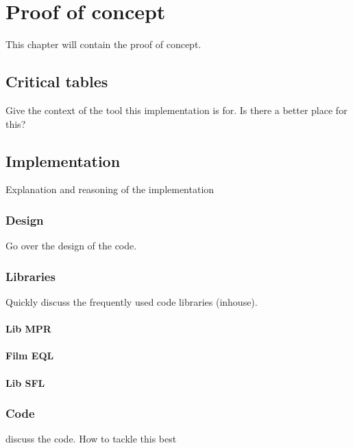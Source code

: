 
\chapter{Proof of concept}
\label{ch:poc}

This chapter will contain the proof of concept.

\section{Critical tables}
Give the context of the tool this implementation is for. Is there a better place for this?

\section{Implementation}
Explanation and reasoning of the implementation

\subsection{Design}
Go over the design of the code.
\subsection{Libraries}
Quickly discuss the frequently used code libraries (inhouse).
\subsubsection{Lib MPR}
\subsubsection{Film EQL}
\subsubsection{Lib SFL}
\subsection{Code}
discuss the code. How to tackle this best


